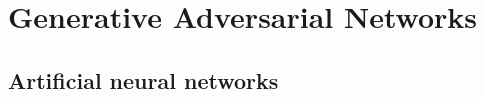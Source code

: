 \documentclass[12pt]{iopart}
\begin{document}
\section{Generative Adversarial Networks}

%
\subsection{Artificial neural networks}

%
\end{document}
